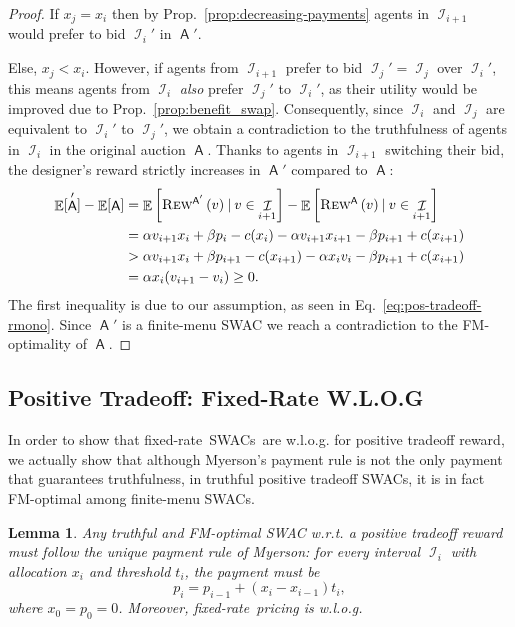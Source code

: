 \documentclass[11pt,letterpaper]{article}
\newcommand{\sqbr}[1]{\left[ #1 \right]}
\newcommand{\fr}{fixed-rate\xspace}
\newcommand{\swac}{SWAC\xspace}
\newcommand{\swacs}{SWACs\xspace}
\newcommand{\finauc}{finite-menu \swac}
\newcommand{\finaucs}{finite-menu \swacs}
\DeclareMathOperator*{\E}{\bb{E}}
\newcommand{\given}{\medspace | \medspace}
\newcommand{\bb}[1]{\mathbb{#1}}
\DeclareMathOperator{\A}{\auc{A}}
\DeclareMathOperator{\I}{\mathcal{I}}
\theoremstyle{plain}
\newtheorem{lemma}[theorem]{Lemma}
\newcommand{\auc}[1]{\mathsf{#1}}
\begin{document}
\begin{proof}
If $x_j=x_i$ then by Prop.~\ref{prop:decreasing-payments} agents in $\I_{i+1}$ would prefer to bid $\I_i'$ in $\A'$. 

Else, $x_j<x_i$.
However,
if 
agents from $\I_{i+1}$ prefer to bid $\I_j' = \I_j$
over $\I_i'$,
this means agents from $\I_i$ \emph{also}
prefer $\I_j'$ to $\I_i'$,
as their utility would be improved due to Prop.~\ref{prop:benefit_swap}.
Consequently, since $\I_i$ and $\I_j$ are equivalent to $\I_i'$ to $\I_j'$,
we obtain a contradiction to the truthfulness of agents in $\I_i$ in the original auction $\A$.
 Thanks to agents in $\I_{i+1}$
 switching their bid, 
 the designer's reward strictly increases in $\A'$ compared to $\A$:
\begin{align*}
    \E[\A']-\E[\A]&=\E\sqbr{\trew[\A']{v}\given v\in\I_{i+1}}-\E\sqbr{\trew[\A]{v}\given v\in\I_{i+1}}\\
    &=\alpha v_{i+1}x_i+\beta p_i-c(x_i)-\alpha v_{i+1}x_{i+1}-\beta p_{i+1}+c(x_{i+1})\\
    &>\alpha v_{i+1}x_i+\beta p_{i+1}-c(x_{i+1})-\alpha x_iv_i-\beta p_{i+1}+c(x_{i+1})\\
    &=\alpha x_i (v_{i+1}-v_i)\geq 0.
\end{align*}
The first inequality is due to our assumption, as seen in Eq.~\ref{eq:pos-tradeoff-rmono}.
Since $\A'$ is a \finauc we reach a contradiction to the FM-optimality of $\A$.
\end{proof}

\subsection{Positive Tradeoff: Fixed-Rate W.L.O.G} 
In order to show that \fr\ \swacs\ are w.l.o.g. for positive tradeoff reward, we actually show that although Myerson's payment rule is not the only payment that guarantees truthfulness,
in truthful positive tradeoff \swacs, it is in fact FM-optimal among \finaucs.

\begin{lemma}\label{lemma:positive-tradeoff-fr-wlog}
    Any truthful and FM-optimal \swac w.r.t. a positive tradeoff reward must follow the unique payment rule of Myerson: for every interval $\I_i$ with allocation $x_i$ and threshold $t_i$, the payment must be
    \begin{equation}
        p_i=p_{i-1}+(x_i-x_{i-1})t_i,
    \end{equation}
    where $x_0=p_0=0$.
    Moreover, \fr\ pricing is w.l.o.g.
\end{lemma}
\end{document}
